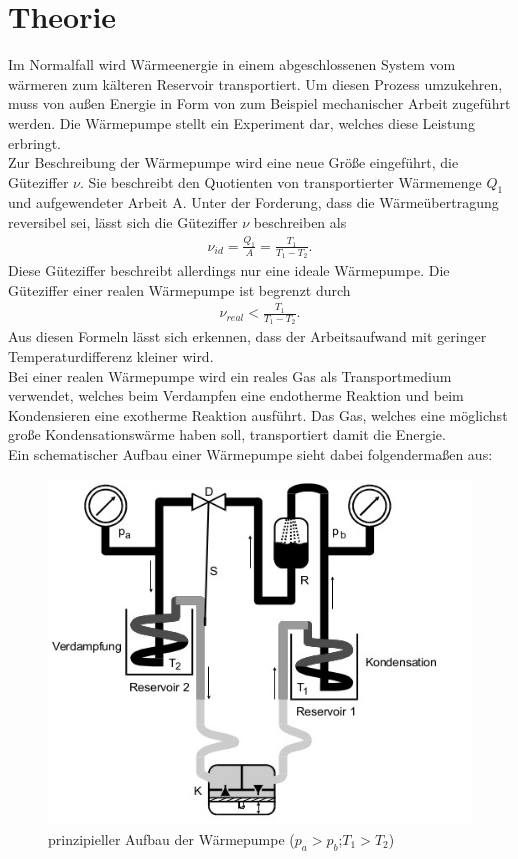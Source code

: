 \section{Theorie}\justifying
Im Normalfall wird Wärmeenergie in einem abgeschlossenen System vom wärmeren zum kälteren Reservoir transportiert. Um diesen Prozess 
umzukehren, muss von außen Energie in Form von zum Beispiel mechanischer Arbeit zugeführt werden.
Die Wärmepumpe stellt ein Experiment dar, welches diese Leistung erbringt. \\
Zur Beschreibung der Wärmepumpe wird eine neue Größe eingeführt, die Güteziffer $\nu$.
Sie beschreibt den Quotienten von transportierter Wärmemenge $Q_1$ und aufgewendeter
Arbeit A. Unter der Forderung, dass die Wärmeübertragung reversibel sei, lässt
sich die Güteziffer $\nu$ beschreiben als \cite{V206}
\begin{align}
    \nu _{id} = \frac{Q_1}{A}=\frac{T_1}{T_1-T_2}. \label{eq:1}
\end{align}
Diese Güteziffer beschreibt allerdings nur eine ideale Wärmepumpe. Die
Güteziffer einer realen Wärmepumpe ist begrenzt durch \cite{V206}
\begin{align}
    \nu _{real} < \frac{T_1}{T_1-T_2}. \label{eq:2}
\end{align}
Aus diesen Formeln  lässt sich erkennen, dass der Arbeitsaufwand mit geringer 
Temperaturdifferenz kleiner wird.\\
Bei einer realen Wärmepumpe wird ein reales Gas als Transportmedium verwendet, welches
beim Verdampfen eine endotherme Reaktion und beim Kondensieren eine exotherme Reaktion
ausführt. Das Gas, welches eine möglichst große Kondensationswärme haben soll, transportiert
damit die Energie. \\
Ein schematischer Aufbau einer Wärmepumpe sieht dabei folgendermaßen aus:
\begin{figure}[H]
    \centering
    \includegraphics[width=0.75\linewidth]{./images/theo_Aufbau.jpg}
    \caption{prinzipieller Aufbau der Wärmepumpe ($p_a>p_b$;$T_1>T_2$) \cite{V206}} 
    \label{fig:1}
\end{figure}
